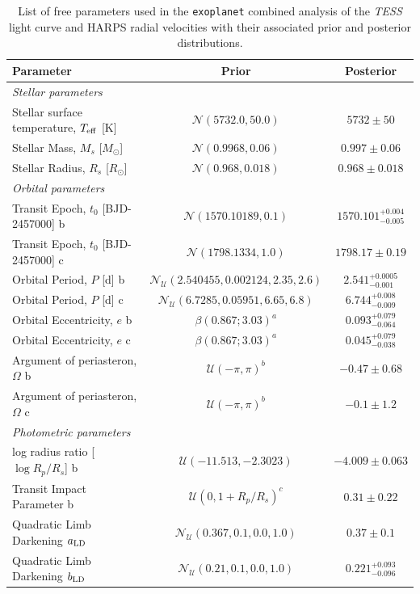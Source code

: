 \documentclass[fleqn,usenatbib]{mnras}
\newcommand{\tess}{{\it TESS}}
\newcommand{\harps}{{HARPS}}
\newcommand{\teff}{$T_{\rm eff}$}
\newcommand{\TTeff}{ $ 5732 \pm 50 $ }
\newcommand{\Tmstar}{ $ 0.997 \pm 0.06 $ }
\newcommand{\Trstar}{ $ 0.968 \pm 0.018 $ }
\newcommand{\Ttzerozero}{ $ 1570.101^{+0.004}_{-0.005} $ }
\newcommand{\Ttzeroone}{ $ 1798.17 \pm 0.19 $ }
\newcommand{\TPzero}{ $ 2.541^{+0.0005}_{-0.001} $ }
\newcommand{\TPone}{ $ 6.744^{+0.008}_{-0.009} $ }
\newcommand{\Tecczero}{ $ 0.093^{+0.079}_{-0.064} $ }
\newcommand{\Teccone}{ $ 0.045^{+0.079}_{-0.038} $ }
\newcommand{\Tomegazero}{ $ -0.47 \pm 0.68 $ }
\newcommand{\Tomegaone}{ $ -0.1 \pm 1.2 $ }
\newcommand{\Tlogror}{ $ -4.009 \pm 0.063 $ }
\newcommand{\Tb}{ $ 0.31 \pm 0.22 $ }
\newcommand{\Tustartesszero}{ $ 0.37 \pm 0.1 $ }
\newcommand{\Tustartessone}{ $ 0.221^{+0.093}_{-0.096} $ }
\begin{document}
\centering
\begin{table}
\caption{List of free parameters used in the \texttt{exoplanet} combined analysis of the \tess{} light curve and \harps{} radial velocities with their associated prior and posterior distributions.}
\label{tab:planetparlong}
\begin{center}
\begin{tabular}{lcc}
\hline
\hline
Parameter & Prior & Posterior\\
\hline
\hline
\multicolumn{3}{l}{\it Stellar parameters}\\
Stellar surface temperature, \teff{} [K] &  $\mathcal{N}(5732.0,50.0)$  & \TTeff{} \\
Stellar Mass, $M_s$ [$M_{\odot}$] &  $\mathcal{N}(0.9968,0.06)$  & \Tmstar{} \\
Stellar Radius, $R_s$ [$R_{\odot}$] &  $\mathcal{N}(0.968,0.018)$  & \Trstar{} \\
\hline
\multicolumn{3}{l}{\it Orbital parameters}\\
Transit Epoch, $t_0$ [BJD-2457000] b &  $\mathcal{N}(1570.10189,0.1)$  &  \Ttzerozero{} \\
Transit Epoch, $t_0$ [BJD-2457000] c &  $\mathcal{N}(1798.1334,1.0)$  & \Ttzeroone{} \\
Orbital Period, $P$ [d] b &  $\mathcal{N}_{\mathcal{U}}(2.540455,0.002124,2.35,2.6)$  & \TPzero{} \\
Orbital Period, $P$ [d] c &  $\mathcal{N}_{\mathcal{U}}(6.7285,0.05951,6.65,6.8)$  & \TPone{} \\
Orbital Eccentricity, $e$ b &  $\beta(0.867;3.03)^{a}$  & \Tecczero{} \\
Orbital Eccentricity, $e$ c &  $\beta(0.867;3.03)^{a}$  & \Teccone{} \\
Argument of periasteron, $\Omega$ b &  $\mathcal{U}(-\pi,\pi)^{b}$  &  \Tomegazero{} \\
Argument of periasteron, $\Omega$ c &  $\mathcal{U}(-\pi,\pi)^{b}$  & \Tomegaone{} \\
\hline
\multicolumn{3}{l}{\it Photometric parameters}\\
log radius ratio [$\log{R_p/R_s}$] b &  $\mathcal{U}(-11.513,-2.3023)$  & \Tlogror{} \\
Transit Impact Parameter b & $\mathcal{U}(0,1+R_p/R_s)^{c}$  & \Tb{} \\
Quadratic Limb Darkening $a_{\rm LD}$ &  $\mathcal{N}_{\mathcal{U}}(0.367,0.1,0.0,1.0)$  & \Tustartesszero{}\\
Quadratic Limb Darkening $b_{\rm LD}$ &  $\mathcal{N}_{\mathcal{U}}(0.21,0.1,0.0,1.0)$  & \Tustartessone{} \\

\end{tabular}
\end{center}
\end{table}
\end{document}
